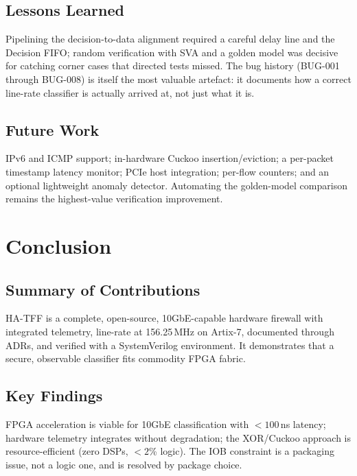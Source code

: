 \documentclass[12pt,twoside,openright]{book}
\begin{document}
\section{Lessons Learned}

Pipelining the decision-to-data alignment required a careful delay line and the Decision FIFO;
random verification with SVA and a golden model was decisive for catching corner cases that directed
tests missed. The bug history (BUG-001 through BUG-008) is itself the most valuable artefact: it
documents how a correct line-rate classifier is actually arrived at, not just what it is.

\section{Future Work}

IPv6 and ICMP support; in-hardware Cuckoo insertion/eviction; a per-packet timestamp latency monitor;
PCIe host integration; per-flow counters; and an optional lightweight anomaly detector. Automating
the golden-model comparison remains the highest-value verification improvement.

\chapter{Conclusion}
\label{chap:conclusion}

\section{Summary of Contributions}

HA-TFF is a complete, open-source, 10GbE-capable hardware firewall with integrated telemetry,
line-rate at 156.25\,MHz on Artix-7, documented through ADRs, and verified with a SystemVerilog
environment. It demonstrates that a secure, observable classifier fits commodity FPGA fabric.

\section{Key Findings}

FPGA acceleration is viable for 10GbE classification with $<100$\,ns latency; hardware telemetry
integrates without degradation; the XOR/Cuckoo approach is resource-efficient (zero DSPs, $<2$\%
logic). The IOB constraint is a packaging issue, not a logic one, and is resolved by package choice.
\end{document}
